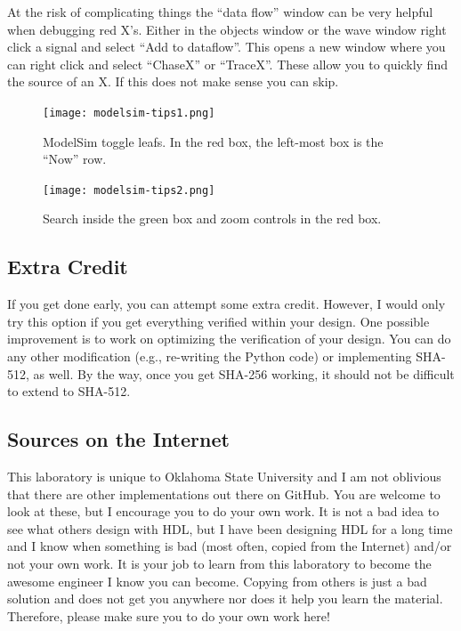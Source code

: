 \documentclass{article}
\begin{document}
At the risk of complicating things the ``data flow'' window can be very
helpful when debugging red X's.  Either in the objects window or the wave
window right click a signal and select ``Add to dataflow''. This opens
a new window where you can right click and select ``ChaseX'' or ``TraceX''.
These allow you to quickly find the source of an X.  If this does not make
sense you can skip.
\begin{figure} [t!]
  \centering
  \texttt{[image: modelsim-tips1.png]}
  \caption{ModelSim toggle leafs. In the red box, the left-most box is the ``Now'' row.}
  \label{modelsim-tips1.png}
\end{figure}
\begin{figure} [t!]
  \centering
  \texttt{[image: modelsim-tips2.png]}
  \caption{Search inside the green box and zoom controls in the red box.}
  \label{modelsim-tips2.png}
\end{figure}

\subsection{Extra Credit}

If you get done early, you can attempt some extra credit.  However, I
would only try this option if you get everything verified within your
design.  
One possible improvement is to work on optimizing the verification
of your design.  You can do any other modification (e.g., re-writing
the Python code) or implementing SHA-512, as well.  By the way, once
you get SHA-256 working, it should not be difficult to extend to
SHA-512.

\subsection{Sources on the Internet}

This laboratory is unique to Oklahoma State University and I am not
oblivious that there are other implementations out there on GitHub.
You are welcome to look at these, but I encourage you to do your own
work.  It is not a bad idea to see what others design with HDL, but I
have been
designing HDL for a long time and I know when something is bad (most
often, copied from the Internet) and/or not your own work.  It is your job
to learn from this laboratory to become the awesome engineer I know
you can become.  Copying from others is just a bad solution and does
not get you anywhere nor does it help you learn the material.
Therefore, please make sure you to do your own
work here!
\end{document}
